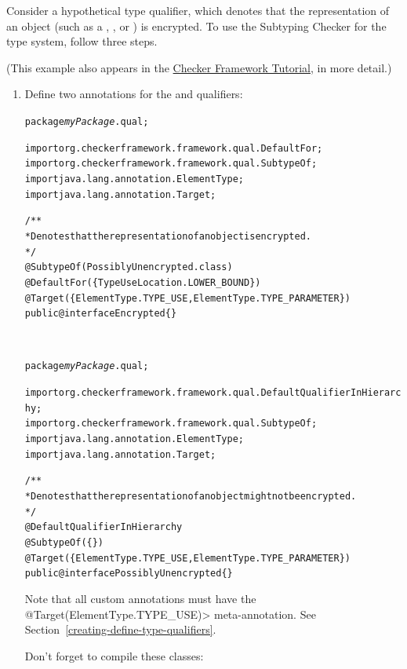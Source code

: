 
Consider a hypothetical  type qualifier, which denotes that the
representation of an object (such as a , , or
) is encrypted. To use the Subtyping Checker for the 
type system, follow three steps.

(This example also appears in the
\href{https://eisop.github.io/cf/tutorial/webpages/encryption-checker-cmd.html}{Checker
  Framework Tutorial}, in more detail.)

\begin{enumerate}
\item
Define two annotations for the  and  qualifiers:

\begin{alltt}
package \textit{myPackage}.qual;

import org.checkerframework.framework.qual.DefaultFor;
import org.checkerframework.framework.qual.SubtypeOf;
import java.lang.annotation.ElementType;
import java.lang.annotation.Target;

/**
 * Denotes that the representation of an object is encrypted.
 */
@SubtypeOf(PossiblyUnencrypted.class)
@DefaultFor(\{TypeUseLocation.LOWER_BOUND\})
@Target(\{ElementType.TYPE_USE, ElementType.TYPE_PARAMETER\})
public @interface Encrypted \{\}
\end{alltt}

~

\begin{alltt}
package \textit{myPackage}.qual;

import org.checkerframework.framework.qual.DefaultQualifierInHierarchy;
import org.checkerframework.framework.qual.SubtypeOf;
import java.lang.annotation.ElementType;
import java.lang.annotation.Target;

/**
 * Denotes that the representation of an object might not be encrypted.
 */
@DefaultQualifierInHierarchy
@SubtypeOf(\{\})
@Target(\{ElementType.TYPE_USE, ElementType.TYPE_PARAMETER\})
public @interface PossiblyUnencrypted \{\}
\end{alltt}

Note that all custom annotations must have the
\<@Target(ElementType.TYPE\_USE)> meta-annotation.
See Section~\ref{creating-define-type-qualifiers}.

Don't forget to compile these classes:


\end{enumerate}
